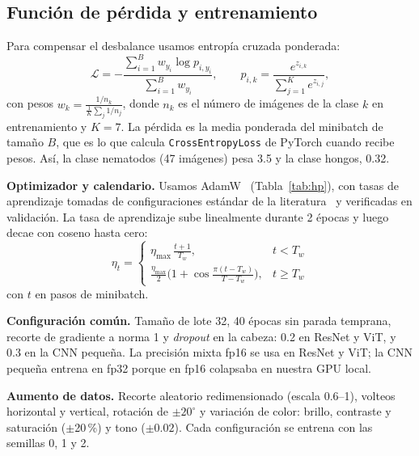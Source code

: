 \documentclass[conference,a4paper]{IEEEtran}
\begin{document}
\subsection{Función de pérdida y entrenamiento}
Para compensar el desbalance usamos entropía cruzada ponderada:
\begin{equation}
\mathcal{L}=-\frac{\sum_{i=1}^{B} w_{y_i}\log p_{i,y_i}}{\sum_{i=1}^{B} w_{y_i}},\qquad
p_{i,k}=\frac{e^{z_{i,k}}}{\sum_{j=1}^{K}e^{z_{i,j}}},
\end{equation}
con pesos $w_k=\frac{1/n_k}{\frac{1}{K}\sum_{j}1/n_j}$, donde $n_k$ es el número de imágenes de la clase $k$ en entrenamiento y $K=7$. La pérdida es la media ponderada del minibatch de tamaño $B$, que es lo que calcula \texttt{CrossEntropyLoss} de PyTorch cuando recibe pesos. Así, la clase nematodos (47 imágenes) pesa 3.5 y la clase hongos, 0.32.

\textbf{Optimizador y calendario.} Usamos AdamW~\cite{loshchilov2019adamw} (Tabla~\ref{tab:hp}), con tasas de aprendizaje tomadas de configuraciones estándar de la literatura~\cite{dosovitskiy2021vit,steiner2022howtotrain} y verificadas en validación. La tasa de aprendizaje sube linealmente durante 2 épocas y luego decae con coseno hasta cero:
\begin{equation}
\eta_t=\begin{cases}\eta_{\max}\,\frac{t+1}{T_w}, & t<T_w\\[2pt]
\frac{\eta_{\max}}{2}\Big(1+\cos\frac{\pi(t-T_w)}{T-T_w}\Big), & t\geq T_w\end{cases}
\end{equation}
con $t$ en pasos de minibatch.

\textbf{Configuración común.} Tamaño de lote 32, 40 épocas sin parada temprana, recorte de gradiente a norma 1 y \textit{dropout} en la cabeza: 0.2 en ResNet y ViT, y 0.3 en la CNN pequeña. La precisión mixta fp16 se usa en ResNet y ViT; la CNN pequeña entrena en fp32 porque en fp16 colapsaba en nuestra GPU local.

\textbf{Aumento de datos.} Recorte aleatorio redimensionado (escala 0.6--1), volteos horizontal y vertical, rotación de $\pm20^\circ$ y variación de color: brillo, contraste y saturación ($\pm$20\,\%) y tono ($\pm0.02$). Cada configuración se entrena con las semillas 0, 1 y 2.

\begin{table}[t]
\caption{Hiperparámetros (AdamW, lote 32, 40 épocas, 224$\times$224)}
\label{tab:hp}
\centering\small
{}                              
\end{table}
\end{document}
